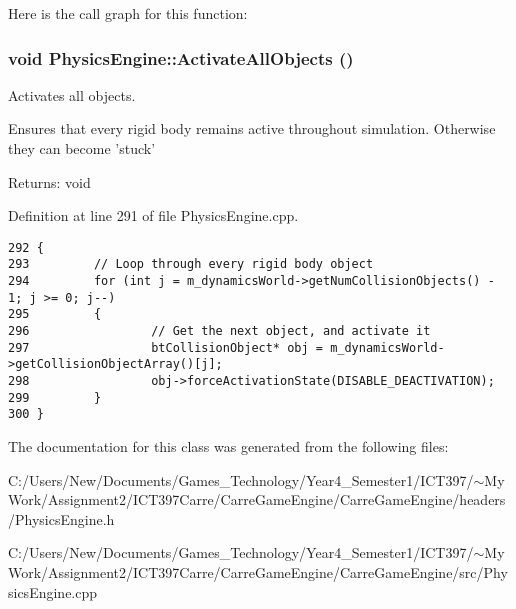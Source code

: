 Here is the call graph for this function:\hypertarget{class_physics_engine_2e877a86ca85b2ec58b3c046af057d76}{
\subsubsection[ActivateAllObjects]{\setlength{\rightskip}{0pt plus 5cm}void PhysicsEngine::ActivateAllObjects ()}}
\label{class_physics_engine_2e877a86ca85b2ec58b3c046af057d76}


Activates all objects. 

Ensures that every rigid body remains active throughout simulation. Otherwise they can become 'stuck'

\begin{Desc}
\item[Returns:]void \end{Desc}


Definition at line 291 of file PhysicsEngine.cpp.

\begin{Code}\begin{verbatim}292 {
293         // Loop through every rigid body object
294         for (int j = m_dynamicsWorld->getNumCollisionObjects() - 1; j >= 0; j--)
295         {
296                 // Get the next object, and activate it
297                 btCollisionObject* obj = m_dynamicsWorld->getCollisionObjectArray()[j];
298                 obj->forceActivationState(DISABLE_DEACTIVATION);
299         }
300 }
\end{verbatim}
\end{Code}




The documentation for this class was generated from the following files:\begin{CompactItemize}
\item 
C:/Users/New/Documents/Games\_\-Technology/Year4\_\-Semester1/ICT397/$\sim$My Work/Assignment2/ICT397Carre/CarreGameEngine/CarreGameEngine/headers/PhysicsEngine.h\item 
C:/Users/New/Documents/Games\_\-Technology/Year4\_\-Semester1/ICT397/$\sim$My Work/Assignment2/ICT397Carre/CarreGameEngine/CarreGameEngine/src/PhysicsEngine.cpp\end{CompactItemize}
